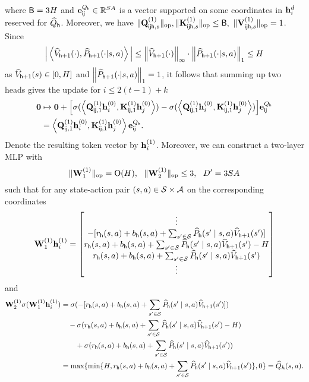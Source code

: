 where ${\mathsf{B}}=3{H}$ and ${\mathbf e}^{{Q}_{\mathsf{h}}}_{{\mathsf{i}}{\mathsf{j}}}\in\mathbb{R}^{{S}{A}}$ is a vector supported on some coordinates in ${\mathbf h}^{d}_i$ reserved for ${\widehat{{Q}}}_{\mathsf{h}}$. Moreover, we have $\|{{\mathbf Q}^{(1)}_{{\mathsf{i}}{\mathsf{j}}{\mathsf{h}},s}}\|_{\mathrm{op}},\|{{\mathbf K}^{(1)}_{{\mathsf{i}}{\mathsf{j}}{\mathsf{h}},s}}\|_{\mathrm{op}}\leq {\mathsf{B}},~\|{{\mathbf V}^{(1)}_{{\mathsf{i}}{\mathsf{j}}{\mathsf{h}},s}}\|_{\mathrm{op}}=1$.
Since $$\Big|\left\langle{\widehat{{{V}}}}_{{\mathsf{h}}+1}(\cdot),\widehat{P}_{{\mathsf{h}}+1}(\cdot|{s},{a})\right\rangle\Big|\leq \left\|{{\widehat{{{V}}}}_{{\mathsf{h}}+1}(\cdot)}\right\|_\infty\cdot\left\|{\widehat{P}_{{\mathsf{h}}+1}(\cdot|{s},{a})}\right\|_1\leq{H}$$ as ${\widehat{{{V}}}}_{{\mathsf{h}}+1}({s})\in[0,{H}]$ and $\left\|{\widehat{P}_{{\mathsf{h}}+1}(\cdot|{s},{a})}\right\|_1=1$, it follows that summing up two heads gives the update for $i\leq 2(t-1)+k$
\begin{align*}
{\mathbf 0}
&\mapsto{\mathbf 0}+\Big[\sigma(\left\langle {\mathbf Q}_{{\mathsf{i}}{\mathsf{j}},1}^{(1)}{\mathbf h}_i^{(0)} , {\mathbf K}_{{\mathsf{i}}{\mathsf{j}},1}^{(1)}{\mathbf h}_j^{(0)} \right\rangle)-\sigma(\left\langle {\mathbf Q}_{{\mathsf{i}}{\mathsf{j}},1}^{(1)}{\mathbf h}_i^{(0)} , {\mathbf K}_{{\mathsf{i}}{\mathsf{j}},1}^{(1)}{\mathbf h}_j^{(0)} \right\rangle)\Big]{\mathbf e}_{{\mathsf{i}}{\mathsf{j}}}^{{Q}_{\mathsf{h}}}\\
&=\left\langle {\mathbf Q}_{{\mathsf{i}}{\mathsf{j}},1}^{(1)}{\mathbf h}_i^{(0)} , {\mathbf K}_{{\mathsf{i}}{\mathsf{j}},1}^{(1)}{\mathbf h}_j^{(0)} \right\rangle{\mathbf e}_{{\mathsf{i}}{\mathsf{j}}}^{{Q}_{\mathsf{h}}}.
\end{align*}
Denote the resulting token vector by ${\mathbf h}_i^{(1)}$.
Moreover, we can construct a two-layer MLP with $$\|{{\mathbf W}^{(1)}_1}\|_{\mathrm{op}}={\mathrm{O}}({H}),~~ \|{{\mathbf W}^{(1)}_2}\|_{\mathrm{op}}\leq 3,~~{D'}=3{S}{A}$$
such that for any state-action pair $({s},{a})\in{\mathcal{S}}\times{\mathcal{A}}$ on the corresponding coordinates
\begin{align*}
{\mathbf W}^{(1)}_1{\mathbf h}_i^{(1)}=
\begin{bmatrix}
\vdots\\-[{{r}}_{\mathsf{h}}({s},{a})+{b}_{\mathsf{h}}({s},{a})+\sum_{{s}'\in{\mathcal{S}}}\widehat{P}_{\mathsf{h}}({s}'\mid{s},{a}){\widehat{{{V}}}}_{{\mathsf{h}}+1}({s}')]
\\
{{r}}_{\mathsf{h}}({s},{a})+{b}_{\mathsf{h}}({s},{a})+\sum_{{s}'\in{\mathcal{S}}}\widehat{P}_{\mathsf{h}}({s}'\mid{s},{a}){\widehat{{{V}}}}_{{\mathsf{h}}+1}({s}')-{H}\\{{r}}_{\mathsf{h}}({s},{a})+{b}_{\mathsf{h}}({s},{a})+\sum_{{s}'\in{\mathcal{S}}}\widehat{P}_{\mathsf{h}}({s}'\mid{s},{a}){\widehat{{{V}}}}_{{\mathsf{h}}+1}({s}')\\\vdots
\end{bmatrix}
\end{align*}
 and \begin{align*}
  {\mathbf W}^{(1)}_2\sigma({\mathbf W}^{(1)}_1{\mathbf h}_i^{(1)})
  &=   \sigma(-[{{r}}_{\mathsf{h}}({s},{a})+{b}_{\mathsf{h}}({s},{a})+\sum_{{s}'\in{\mathcal{S}}}\widehat{P}_{\mathsf{h}}({s}'\mid{s},{a}){\widehat{{{V}}}}_{{\mathsf{h}}+1}({s}')])\\&\quad-\sigma({{r}}_{\mathsf{h}}({s},{a})+{b}_{\mathsf{h}}({s},{a})+\sum_{{s}'\in{\mathcal{S}}}\widehat{P}_{\mathsf{h}}({s}'\mid{s},{a}){\widehat{{{V}}}}_{{\mathsf{h}}+1}({s}')-{H})\\
&\qquad+\sigma({{r}}_{\mathsf{h}}({s},{a})+{b}_{\mathsf{h}}({s},{a})+\sum_{{s}'\in{\mathcal{S}}}\widehat{P}_{\mathsf{h}}({s}'\mid{s},{a}){\widehat{{{V}}}}_{{\mathsf{h}}+1}({s}'))\\
&=\max\{\min\{{H},{{r}}_{\mathsf{h}}({s},{a})+{b}_{\mathsf{h}}({s},{a})+\sum_{{s}'\in{\mathcal{S}}}\widehat{P}_{\mathsf{h}}({s}'\mid{s},{a}){\widehat{{{V}}}}_{{\mathsf{h}}+1}({s}')\},0\}={\widehat{{Q}}}_h({s},{a}).
 \end{align*}
